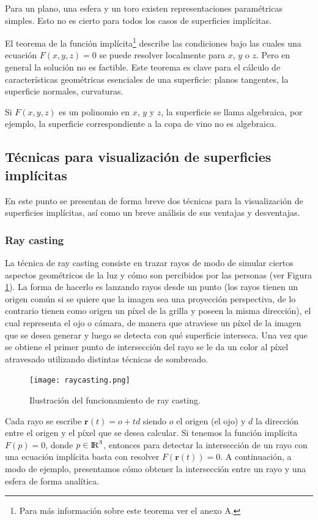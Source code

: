 \documentclass[12pt]{article}
\begin{document}
Para un plano, una esfera y un toro existen representaciones paramétricas simples. Esto no es cierto para todos los casos de superficies implícitas.

El teorema de la función implícita\footnote{Para más información sobre este teorema ver el anexo A.} describe las condiciones bajo las cuales una ecuación $F (x, y, z) = 0$ se puede resolver localmente para $x$, $y$ o $z$. Pero en general la solución no es factible. Este teorema es clave para el cálculo de características geométricas esenciales de una superficie: planos tangentes, la superficie normales, curvaturas.

Si $F (x, y, z)$ es un polinomio en $x$, $y$ y $z$, la superficie se llama algebraica,  por ejemplo, la superficie correspondiente a la copa de vino no es algebraica.

\subsection{Técnicas para visualización de superficies implícitas}
\noindent En este punto se presentan de forma breve dos técnicas para la visualización de superficies implícitas, así como un breve análisis de sus ventajas y desventajas.
\subsubsection{Ray casting}
\noindent La técnica de ray casting consiste en trazar rayos de modo de simular ciertos aspectos geométricos de la luz y cómo son percibidos por las personas (ver Figura \ref{raycasting}). La forma de hacerlo es lanzando rayos desde un punto (los rayos tienen un origen común si se quiere que la imagen sea una proyección perspectiva, de lo contrario tienen como origen un píxel de la grilla y poseen la misma dirección), el cual representa el ojo o cámara, de manera que atraviese un píxel de la imagen que se desea generar y luego se detecta con qué superficie interseca. Una vez que se obtiene el primer punto de intersección del rayo se le da un color al píxel atravesado utilizando distintas técnicas de sombreado.
\begin{figure}[h!]
\texttt{[image: raycasting.png]}
\caption{Ilustración del funcionamiento de ray casting.}
\label{raycasting}
\end{figure}

Cada rayo se escribe $\textbf{r}(t)= o +td$ siendo $o$ el origen (el ojo) y $d$ la dirección entre el origen y el píxel que se desea calcular. Si tenemos la función implícita $F(p)=0$, donde $p \in {\rm I\!R} ^3 $, entonces para detectar la intersección de un rayo con una ecuación implícita basta con resolver $F(\textbf{r}(t))=0$.
A continuación, a modo de ejemplo, presentamos cómo obtener la intersección entre un rayo y una esfera de forma analítica\cite{realtimerendering}.
\end{document}
